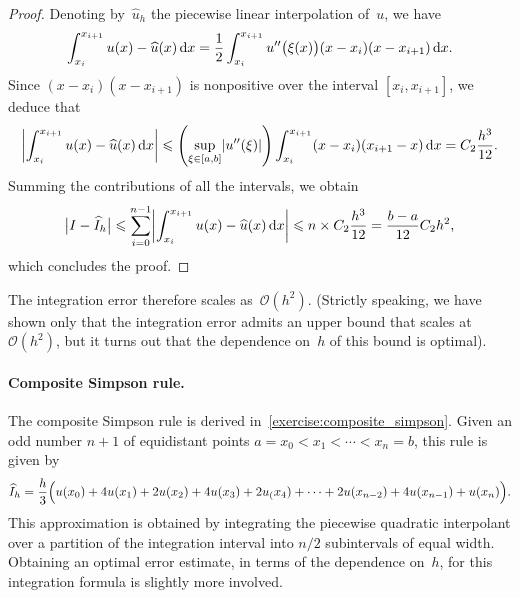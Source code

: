 \begin{proof}
Denoting by~$\widehat u_h$ the piecewise linear interpolation of~$u$,
we have
\[
    \int_{x_{i}}^{x_{i+1}} u(x) - \widehat u(x) \, \mathrm d x
    = \frac{1}{2} \int_{x_{i}}^{x_{i+1}} u''\bigl(\xi(x)\bigr) (x - x_{i}) (x - x_{i+1}) \, \mathrm d x.
\]
Since $(x - x_i) (x - x_{i+1})$ is nonpositive over the interval $[x_i, x_{i+1}]$,
we deduce that
\[
    \abs*{\int_{x_{i}}^{x_{i+1}} u(x) - \widehat u(x) \, \d x}
    \leq \left( \sup_{\xi \in [a, b]} \abs*{u''(\xi)} \right) \int_{x_{i}}^{x_{i+1}} (x - x_{i}) (x_{i+1} - x) \, \d x
    = C_2 \frac{h^3}{12}.
\]
Summing the contributions of all the intervals,
we obtain
\[
    \bigl\lvert I - \widehat I_h \bigr\rvert
    \leq \sum_{i=0}^{n-1} \abs*{\int_{x_i}^{x_{i+1}} u(x) - \widehat u(x) \, \d x }
    \leq n \times C_2 \frac{h^3}{12} = \frac{b-a}{12} C_2 h^2,
\]
which concludes the proof.
\end{proof}

The integration error therefore scales as~$\mathcal O(h^2)$.
(Strictly speaking, we have shown only that the integration error admits an upper bound that scales at $\mathcal O(h^2)$,
but it turns out that the dependence on~$h$ of this bound is optimal).

\paragraph{Composite Simpson rule.}
The composite Simpson rule is derived in~\cref{exercise:composite_simpson}.
Given an odd number $n+1$ of equidistant points $a = x_0 < x_1 < \dotsb < x_n = b$,
this rule is given by
\begin{equation}
    \label{eq:composite_simpson}
    \widehat I_h = \frac{h}{3} \Bigl( u(x_0) + 4 u(x_1) + 2 u(x_2) + 4 u(x_3) + 2 u_(x_4) + \dotsb + 2 u(x_{n-2}) + 4 u(x_{n-1}) + u(x_n)\Bigr).
\end{equation}
This approximation is obtained by integrating the piecewise quadratic interpolant
over a partition of the integration interval into $n/2$ subintervals of equal width.
Obtaining an optimal error estimate,
in terms of the dependence on~$h$,
for this integration formula is slightly more involved.

